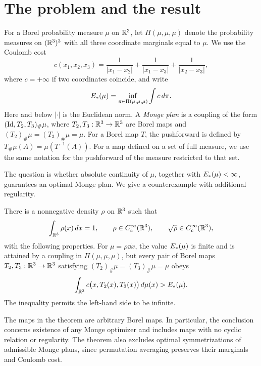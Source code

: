 \section{The problem and the result}\label{sec:introduction}

For a Borel probability measure \(\mu\) on \(\mathbb R^3\), let
\(\Pi(\mu,\mu,\mu)\) denote the probability measures on \((\mathbb R^3)^3\)
with all three coordinate marginals equal to \(\mu\). We use the
Coulomb cost
\begin{equation}\label{eq:cost}
 c(x_1,x_2,x_3)=\frac1{|x_1-x_2|}
                 +\frac1{|x_1-x_3|}
                 +\frac1{|x_2-x_3|},
\end{equation}
where \(c=+\infty\) if two coordinates coincide, and write
\[
 E_*(\mu)=\inf_{\pi\in\Pi(\mu,\mu,\mu)}\int c\,d\pi.
\]
Here and below \(|\cdot|\) is the Euclidean norm.
A \emph{Monge plan} is a coupling of the form
\((\operatorname{Id},T_2,T_3)_\#\mu\), where \(T_2,T_3:\mathbb R^3\to\mathbb R^3\) are
Borel maps and \((T_2)_\#\mu=(T_3)_\#\mu=\mu\).
For a Borel map \(T\), the pushforward is defined by
\(T_\#\mu(A)=\mu(T^{-1}(A))\).
For a map defined on a set of full measure, we use the same notation
for the pushforward of the measure restricted to that set.

The question is whether absolute continuity of \(\mu\), together
with \(E_*(\mu)<\infty\), guarantees an optimal Monge plan.
We give a counterexample with additional regularity.

\begin{theorem}\label{thm:main}
There is a nonnegative density \(\rho\) on \(\mathbb R^3\) such that
\[
 \int_{\mathbb R^3}\rho(x)\,d x=1,\qquad
 \rho\in C_c^\infty(\mathbb R^3),\qquad
 \sqrt{\rho}\in C_c^\infty(\mathbb R^3),
\]
with the following properties. For \(\mu=\rho\dd x\), the value
\(E_*(\mu)\) is finite and is attained by a coupling in
\(\Pi(\mu,\mu,\mu)\), but every pair of Borel maps
\(T_2,T_3:\mathbb R^3\to\mathbb R^3\) satisfying
\((T_2)_\#\mu=(T_3)_\#\mu=\mu\) obeys
\[
 \int_{\mathbb R^3}c\bigl(x,T_2(x),T_3(x)\bigr)\,d\mu(x)>E_*(\mu).
\]
The inequality permits the left-hand side to be infinite.
\end{theorem}

The maps in the theorem are arbitrary Borel maps. In particular, the
conclusion concerns existence of any Monge optimizer and includes
maps with no cyclic relation or regularity.
The theorem also excludes optimal symmetrizations of admissible
Monge plans, since permutation averaging preserves their marginals
and Coulomb cost.

